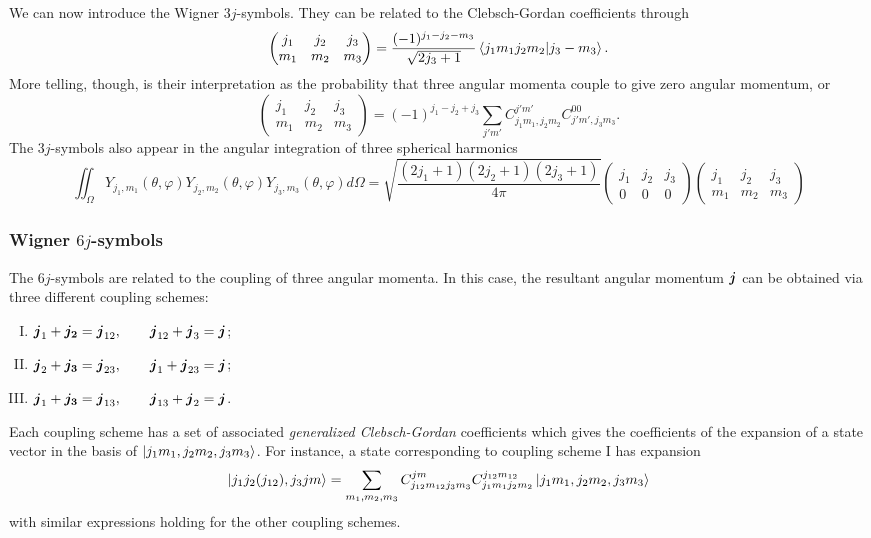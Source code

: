 We can now introduce the Wigner $3j$-symbols. They can be related
to the Clebsch-Gordan coefficients through
  \begin{equation}
   \begin{pmatrix} j_1 & j_2 & j_3 \\
		   m_1 & m_2 & m_3
   \end{pmatrix}
    = \frac{(-1)^{j_1-j_2-m_3}}{\sqrt{2j_3+1}}\braket{j_1m_1j_2m_2|j_3-m_3}.
  \end{equation}
More telling, though, is their interpretation as the probability
that three angular momenta couple to give zero angular momentum, or
  \begin{equation}
   \begin{pmatrix} j_1 & j_2 & j_3 \\
		   m_1 & m_2 & m_3
   \end{pmatrix}
    = (-1)^{j_1-j_2+j_3}\sum_{j'm'} C^{j'm'}_{j_1m_1,j_2m_2}C^{00}_{j'm',j_3m_3}.
  \end{equation}
The $3j$-symbols also appear in the angular integration of three spherical
harmonics 
  \begin{equation}
    \mathop{\iint}_\Omega Y_{j_1,m_1}(\theta,\varphi)Y_{j_2,m_2}(\theta,\varphi)Y_{j_3,m_3}(\theta,\varphi)d\Omega
      =
    \sqrt{\frac{(2j_1+1)(2j_2+1)(2j_3+1)}{4\pi}}\begin{pmatrix} j_1 & j_2 & j_3 \\ 0 & 0 & 0 \end{pmatrix}\begin{pmatrix} j_1 & j_2 & j_3 \\ m_1 & m_2 & m_3\end{pmatrix}
  \end{equation}

\subsubsection{Wigner $6j$-symbols}
The $6j$-symbols are related to the coupling of three angular momenta. In
this case, the resultant angular momentum $\boldsymbol{j}$ can be obtained via three 
different coupling schemes:
  \begin{enumerate}[I.]
   \item $\boldsymbol{j}_1+\boldsymbol{j_2}=\boldsymbol{j}_{12}, \qquad \boldsymbol{j}_{12}+\boldsymbol{j}_3=\boldsymbol{j}$;
   \item $\boldsymbol{j}_2+\boldsymbol{j_3}=\boldsymbol{j}_{23}, \qquad \boldsymbol{j}_1+\boldsymbol{j}_{23}=\boldsymbol{j}$;
   \item $\boldsymbol{j}_1+\boldsymbol{j_3}=\boldsymbol{j}_{13}, \qquad \boldsymbol{j}_{13}+\boldsymbol{j}_2=\boldsymbol{j}$.
  \end{enumerate}
Each coupling scheme has a set of associated \textit{generalized Clebsch-Gordan}
coefficients which gives the coefficients of the expansion of a state vector
in the basis of $\ket{j_1m_1,j_2m_2,j_3m_3}$. For instance, a state 
corresponding to coupling scheme I has expansion
  \begin{equation}
   \ket{j_1j_2(j_{12}),j_3jm} = \sum_{m_1,m_2,m_3}C_{j_{12}m_{12}j_3m_3}^{jm}C_{j_1m_1j_2m_2}^{j_{12}m_{12}}\ket{j_1m_1,j_2m_2,j_3m_3}
  \end{equation}
with similar expressions holding for the other coupling schemes.

